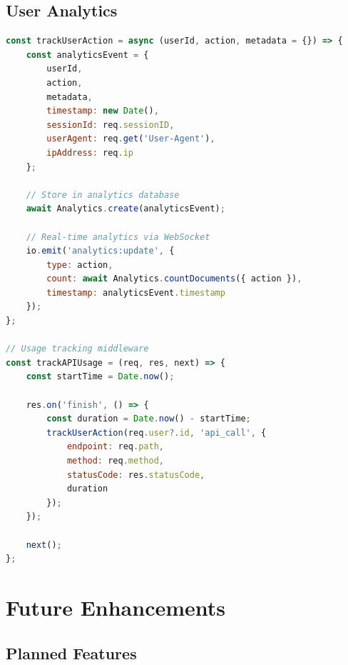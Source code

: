 \documentclass[12pt,a4paper]{article}
\begin{document}
\subsection{User Analytics}

\begin{lstlisting}[language=JavaScript, caption=Analytics Implementation]
const trackUserAction = async (userId, action, metadata = {}) => {
    const analyticsEvent = {
        userId,
        action,
        metadata,
        timestamp: new Date(),
        sessionId: req.sessionID,
        userAgent: req.get('User-Agent'),
        ipAddress: req.ip
    };
    
    // Store in analytics database
    await Analytics.create(analyticsEvent);
    
    // Real-time analytics via WebSocket
    io.emit('analytics:update', {
        type: action,
        count: await Analytics.countDocuments({ action }),
        timestamp: analyticsEvent.timestamp
    });
};

// Usage tracking middleware
const trackAPIUsage = (req, res, next) => {
    const startTime = Date.now();
    
    res.on('finish', () => {
        const duration = Date.now() - startTime;
        trackUserAction(req.user?.id, 'api_call', {
            endpoint: req.path,
            method: req.method,
            statusCode: res.statusCode,
            duration
        });
    });
    
    next();
};
\end{lstlisting}

\section{Future Enhancements}

\subsection{Planned Features}
\end{document}

